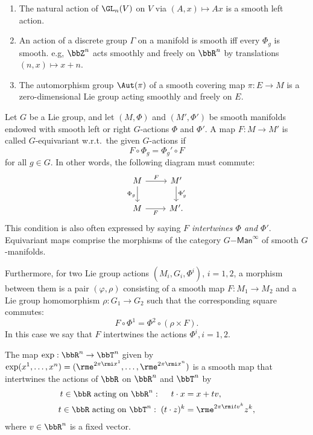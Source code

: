 \begin{example}
    \begin{enumerate}[label=(\alph*)]
        \item The natural action of $\GL_n(V)$ on $V$ via $(A,x)\mapsto Ax$ is a smooth left action.
        \item An action of a discrete group $\varGamma$ on a manifold is smooth iff every $\Phi_g$ is smooth. e.g, $\bbZ^n$ acts smoothly and freely on $\bbR^n$ by translations $(n,x)\mapsto x+n$.
        \item The automorphism group $\Aut(\pi)$ of a smooth covering map $\pi:E\to M$ is a zero-dimensional Lie group acting smoothly and freely on $E$.
    \end{enumerate}
\end{example}

\begin{defn}
    Let $G$ be a Lie group, and let $(M,\Phi)$ and $(M',\Phi')$ be smooth manifolds endowed with smooth left or right $G$-actions $\Phi$ and $\Phi'$. A map $F:M\to M'$ is called $G$-equivariant w.r.t.\ the given $G$-actions if
    \[F\circ \Phi_g=\Phi_g' \circ F\]
    for all $g\in G$.
    In other words, the following diagram must commute:
    \[
    \begin{tikzcd}[every matrix/.append style={name=m}]
       M \arrow[r,"F"]\arrow[d,"\Phi_g",swap] & M'\arrow[d,"\Phi_g'"]\\
       M \arrow[r,"F", swap] & M'.
    \end{tikzcd}
    \]
    This condition is also often expressed by saying \emph{$F$ intertwines $\Phi$ and $\Phi'$}. Equivariant maps comprise the morphisms of the category $G\mathsf{-Man}^\infty$ of smooth $G$-manifolds.

    Furthermore, for two Lie group actions $(M_i,G_i,\Phi^i)$, $i=1,2$, a morphism between them is a pair $(\varphi,\rho)$ consisting of a smooth map $F:M_1\to M_2$ and a Lie group homomorphism $\rho:G_1\to G_2$ such that the corresponding square commutes:
    \[F\circ \Phi^1=\Phi^2\circ \left(\rho\times F \right).\]
    In this case we say that $F$ intertwines the actions $\Phi^i,i=1,2$.
\end{defn}

\begin{example}
    The map $\exp:\bbR^n\to \bbT^n$ given by $\exp(x^1,\ldots,x^n)=(\rme^{2\pi\rmi x^1},\ldots,\rme^{2\pi\rmi x^n})$ is a smooth map that intertwines the actions of $\bbR$ on $\bbR^n$ and $\bbT^n$ by
    \begin{align}
        t\in\bbR\text{ acting on }\bbR^n:\;\quad t\cdot x&=x+tv,\\
        t\in\bbR\text{ acting on }\bbT^n:\; (t\cdot z)^k&=\rme^{2\pi\rmi tv^k}z^k,
    \end{align}
    where $v\in\bbR^n$ is a fixed vector.
\end{example}


